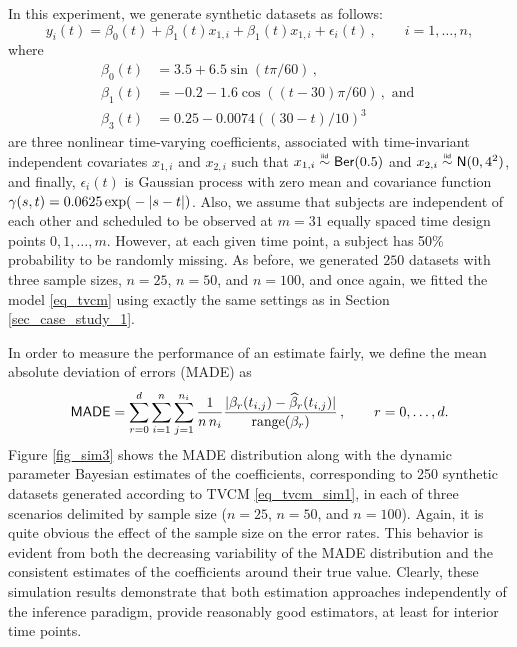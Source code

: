 \documentclass[letterpaper,10pt,openany]{article}
\def\exp#1{{\rm exp}{#1}}
\def\frac#1#2{{{#1}\over{#2}}}
\newcommand\simiid{\mathrel{\overset{\makebox[0pt]{\mbox{\normalfont\tiny\sffamily iid}}}{\sim}}}
\def\Ber{\small{\mathsf{Ber}}}
\def\Nor{\small{\mathsf{N}}}
\begin{document}
In this experiment, we generate synthetic datasets as follows:
\begin{equation}\label{eq_tvcm_sim3}
y_i(t) = \beta_0(t) + \beta_1(t)x_{1,i} + \beta_1(t)x_{1,i} + \epsilon_i(t)\,,\qquad i = 1,\ldots,n,
\end{equation}
where
\begin{align*}
\beta_0(t) &= 3.5+6.5\sin(t\pi/60)\,,\\
\beta_1(t) &= -0.2-1.6\cos((t-30)\pi/60)\,,\text{ and } \\
\beta_3(t) &= 0.25 -0.0074((30-t)/10)^3 
\end{align*}
are three nonlinear time-varying coefficients, associated with time-invariant independent covariates $x_{1,i}$ and $x_{2,i}$ such that $x_{1,i}\simiid\Ber(0.5)$ and $x_{2,i}\simiid\Nor(0, 4^2)$, and finally, $\epsilon_i(t)$ is Gaussian process with zero mean and covariance function $\gamma(s,t) = 0.0625\,\exp(-|s-t|)$. Also, we assume that subjects are independent of each other and scheduled to be observed at $m=31$ equally spaced time design points $0, 1, \ldots , m$. However, at each given time point, a subject has 50\% probability to be randomly missing. As before, we generated $250$ datasets with three sample sizes, $n=25$, $n=50$, and $n=100$, and once again, we fitted the model \eqref{eq_tvcm} using {\color{black} exactly the same settings as in Section \ref{sec_case_study_1}.}


In order to measure the performance of an estimate fairly, we define the mean absolute deviation of errors (\textsf{MADE}) as 
\begin{equation*}
\textsf{MADE} = \sum_{r=0}^d \sum_{i=1}^n\sum_{j=1}^{n_i} \frac{1}{n\,n_i} \frac{|\beta_r(t_{i,j})-\widehat{\beta}_r(t_{i,j})|}{\text{range}(\beta_r)}\,,\qquad r=0,\ldots,d.
\end{equation*}
Figure \ref{fig_sim3} shows the \textsf{MADE} distribution along with the dynamic parameter Bayesian estimates of the coefficients, corresponding to 250 synthetic datasets generated according to \textsf{TVCM} \eqref{eq_tvcm_sim1}, in each of three scenarios delimited by sample size ($n=25$, $n = 50$, and $n=100$). Again, it is quite obvious the effect of the sample size on the error rates. This behavior is evident from both the decreasing variability of the \textsf{MADE} distribution and the consistent estimates of the coefficients around their true value. Clearly, these simulation results demonstrate that both estimation approaches independently of the inference paradigm, provide reasonably good estimators, at least for interior time points.
\end{document}
